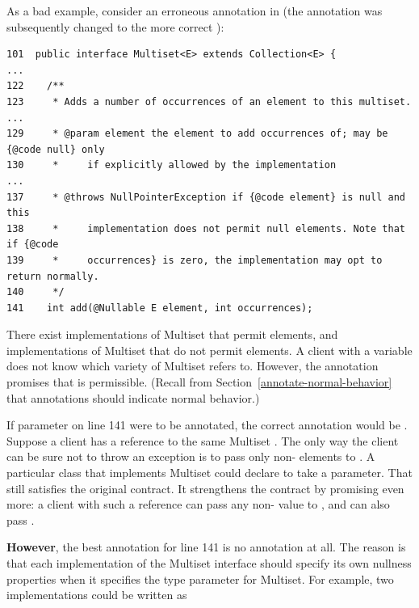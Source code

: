 \begin{sloppypar}
As a bad example, consider an erroneous  annotation in
 (the annotation was
subsequently changed to the more correct ):
\end{sloppypar}

\begin{Verbatim}
101  public interface Multiset<E> extends Collection<E> {
...
122    /**
123     * Adds a number of occurrences of an element to this multiset.
...
129     * @param element the element to add occurrences of; may be {@code null} only
130     *     if explicitly allowed by the implementation
...
137     * @throws NullPointerException if {@code element} is null and this
138     *     implementation does not permit null elements. Note that if {@code
139     *     occurrences} is zero, the implementation may opt to return normally.
140     */
141    int add(@Nullable E element, int occurrences);
\end{Verbatim}

There exist implementations of Multiset that permit  elements,
and implementations of Multiset that do not permit  elements.  A
client with a variable  does not know which variety of
Multiset  refers to.  However, the  annotation
promises that  is permissible.  (Recall from
Section~\ref{annotate-normal-behavior} that annotations should indicate
normal behavior.)

If parameter  on line 141 were to be annotated, the correct
annotation would be .  Suppose a client has a reference to
the same Multiset .  The only way the client can be sure not to throw an exception is to pass
only non- elements to .  A particular class
that implements Multiset could declare  to take a
 parameter.  That still satisfies the original contract.
It strengthens the contract by promising even more:  a client with such a
reference can pass any non- value to , and can also
pass .

\textbf{However}, the best annotation for line 141 is no annotation at all.
The reason is that each implementation of the Multiset interface should
specify its own nullness properties when it specifies the type parameter
for Multiset.  For example, two implementations could be written as

